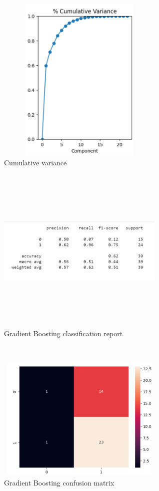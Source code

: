 \documentclass[conference]{IEEEtran}
\begin{document}
 \begin{figure}[!h]
     \centering
     \includegraphics[height=8cm,width=8cm]{cumlative.png}
     \caption{Cumulative variance}
     \label{fig:8}
 \end{figure}


\begin{figure}[!h]
     \centering
     \includegraphics[height=8cm,width=8cm]{gb_classification.png}
     \caption{Gradient Boosting classification report}
     \label{fig:8}
 \end{figure}
 
\\

\begin{figure}[!h]
     \centering
     \includegraphics[height=6cm,width=8cm]{gb_conf.png}
     \caption{Gradient Boosting confusion matrix}
     \label{fig:8}
 \end{figure}
 
\end{document}

